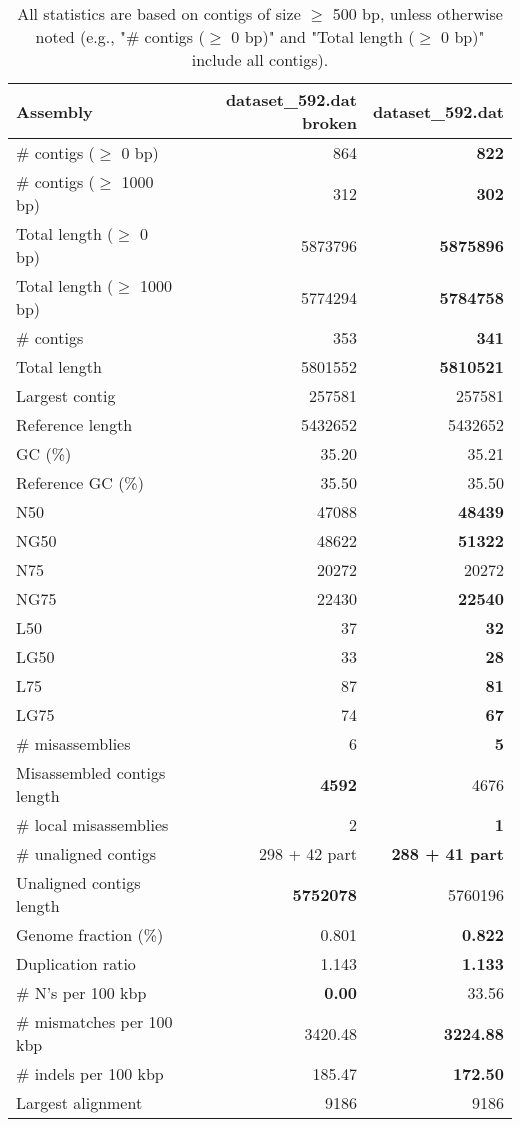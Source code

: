 \documentclass[12pt,a4paper]{article}
\begin{document}
\begin{table}[ht]
\begin{center}
\caption{All statistics are based on contigs of size $\geq$ 500 bp, unless otherwise noted (e.g., "\# contigs ($\geq$ 0 bp)" and "Total length ($\geq$ 0 bp)" include all contigs).}
\begin{tabular}{|l*{2}{|r}|}
\hline
Assembly & dataset\_592.dat broken & dataset\_592.dat \\ \hline
\# contigs ($\geq$ 0 bp) & 864 & {\bf 822} \\ \hline
\# contigs ($\geq$ 1000 bp) & 312 & {\bf 302} \\ \hline
Total length ($\geq$ 0 bp) & 5873796 & {\bf 5875896} \\ \hline
Total length ($\geq$ 1000 bp) & 5774294 & {\bf 5784758} \\ \hline
\# contigs & 353 & {\bf 341} \\ \hline
Total length & 5801552 & {\bf 5810521} \\ \hline
Largest contig & 257581 & 257581 \\ \hline
Reference length & 5432652 & 5432652 \\ \hline
GC (\%) & 35.20 & 35.21 \\ \hline
Reference GC (\%) & 35.50 & 35.50 \\ \hline
N50 & 47088 & {\bf 48439} \\ \hline
NG50 & 48622 & {\bf 51322} \\ \hline
N75 & 20272 & 20272 \\ \hline
NG75 & 22430 & {\bf 22540} \\ \hline
L50 & 37 & {\bf 32} \\ \hline
LG50 & 33 & {\bf 28} \\ \hline
L75 & 87 & {\bf 81} \\ \hline
LG75 & 74 & {\bf 67} \\ \hline
\# misassemblies & 6 & {\bf 5} \\ \hline
Misassembled contigs length & {\bf 4592} & 4676 \\ \hline
\# local misassemblies & 2 & {\bf 1} \\ \hline
\# unaligned contigs & 298 + 42 part & {\bf 288 + 41 part} \\ \hline
Unaligned contigs length & {\bf 5752078} & 5760196 \\ \hline
Genome fraction (\%) & 0.801 & {\bf 0.822} \\ \hline
Duplication ratio & 1.143 & {\bf 1.133} \\ \hline
\# N's per 100 kbp & {\bf 0.00} & 33.56 \\ \hline
\# mismatches per 100 kbp & 3420.48 & {\bf 3224.88} \\ \hline
\# indels per 100 kbp & 185.47 & {\bf 172.50} \\ \hline
Largest alignment & 9186 & 9186 \\ \hline
\end{tabular}
\end{center}
\end{table}
\end{document}
